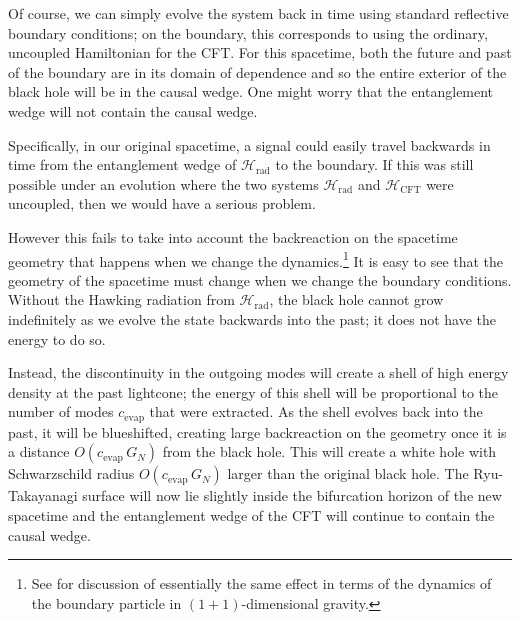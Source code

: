 \documentclass[12pt]{article}
\begin{document}
Of course, we can simply evolve the system back in time using standard reflective boundary conditions; on the boundary, this corresponds to using the ordinary, uncoupled Hamiltonian for the CFT. For this spacetime, both the future and past of the boundary are in its domain of dependence and so the entire exterior of the black hole will be in the causal wedge. One might worry that the entanglement wedge will not contain the causal wedge.

Specifically, in our original spacetime, a signal could easily travel backwards in time from the entanglement wedge of $\mathcal{H}_\text{rad}$ to the boundary. If this was still possible under an evolution where the two systems $\mathcal{H}_\text{rad}$ and $\mathcal{H}_\text{CFT}$ were uncoupled, then we would have a serious problem.

However this fails to take into account the backreaction on the spacetime geometry that happens when we change the dynamics.\footnote{See \cite{almheiri2018holographic} for discussion of essentially the same effect in terms of the dynamics of the boundary particle in $(1+1)$-dimensional gravity.} It is easy to see that the geometry of the spacetime must change when we change the boundary conditions. Without the Hawking radiation from $\mathcal{H}_\text{rad}$, the black hole cannot grow indefinitely as we evolve the state backwards into the past; it does not have the energy to do so. 

Instead, the discontinuity in the outgoing modes will create a shell of high energy density at the past lightcone; the energy of this shell will be proportional to the number of modes $c_\text{evap}$ that were extracted. As the shell evolves back into the past, it will be blueshifted, creating large backreaction on the geometry once it is a distance $O(c_\text{evap}\, G_N)$ from the black hole. This will create a white hole with Schwarzschild radius $O(c_\text{evap}\,G_N)$ larger than the original black hole. The Ryu-Takayanagi surface will now lie slightly inside the bifurcation horizon of the new spacetime and the entanglement wedge of the CFT will continue to contain the causal wedge. 
\end{document}
